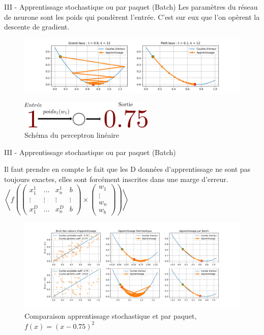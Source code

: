 \documentclass[10pt]{beamer}
\begin{document}
\begin{frame}{III - Apprentissage stochastique ou par paquet (Batch)}
Les paramètres du réseau de neurone sont les poids qui pondèrent l'entrée. C'est sur eux que l'on opèrent la descente de gradient. 
\begin{figure}
	\centering
    \includegraphics[width=\textwidth]{1-DescenteGradient.jpg}
\end{figure}
\begin{figure}
	\centering
    \includegraphics[height=50px]{6-Perceptron.png}
	\caption{Schéma du perceptron linéaire}
\end{figure}
\end{frame}

\begin{frame}{III - Apprentissage stochastique ou par paquet (Batch)}
\begin{multicols}{2}
Il faut prendre en compte le fait que les D données d'apprentissage ne sont pas toujours exactes, elles sont forcément inscrites dans une marge d'erreur. 
\columnbreak
$
\left< f
\left(
\begin{pmatrix}
x_1^{1} & \ldots & x_n^{1} & b \\
\vdots & \vdots & \vdots & \vdots \\
x_1^{D} & \ldots & x_n^{D} & b
\end{pmatrix}
\times
\begin{pmatrix}
w_1 \\
\vdots \\
w_n \\
w_b
\end{pmatrix}
\right) \right>
$
\end{multicols}
\begin{figure}
	\centering
    \includegraphics[width=\textwidth, trim=0 30 0 30, clip]{7-Batch.jpg}
	\caption{Comparaison apprentissage stochastique et par paquet, $f(x) = (x-0.75)^2$}
\end{figure}
\end{frame}
\end{document}
